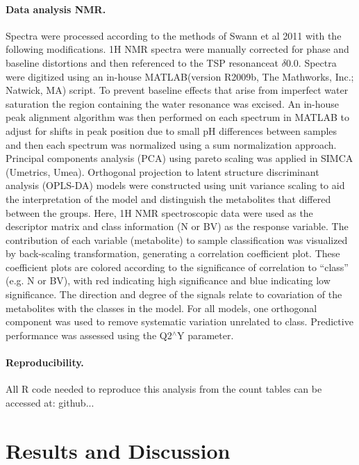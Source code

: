 \documentclass[10pt,letterpaper]{article}
\begin{document}
\paragraph{Data analysis NMR.}  Spectra were processed according to the methods of Swann et al 2011 \cite{Swann:2011} with the following modifications. 1H NMR spectra were manually corrected for phase and baseline distortions and then referenced to the TSP resonanceat $\delta$0.0. Spectra were digitized using an in-house MATLAB(version R2009b, The Mathworks, Inc.; Natwick, MA) script. To prevent baseline effects that arise from imperfect water saturation the region containing the water resonance was excised. An in-house peak alignment algorithm was then performed on each spectrum in MATLAB to adjust for shifts in peak position due to small pH differences between samples and then each spectrum was normalized using a sum normalization approach.  Principal components analysis (PCA) using pareto scaling was applied in SIMCA (Umetrics, Umea). Orthogonal projection to latent structure discriminant analysis (OPLS-DA) models were constructed using unit variance scaling to aid the interpretation of the model and distinguish the metabolites that differed between the groups. Here, 1H NMR spectroscopic data were used as the descriptor matrix and class information (N or BV) as the response variable. The contribution of each variable (metabolite) to sample classification was visualized by back-scaling transformation, generating a correlation coefficient plot. These coefficient plots are colored according to the significance of correlation to “class” (e.g. N or BV), with red indicating high significance and blue indicating low significance. The direction and degree of the signals relate to covariation of the metabolites with the classes in the model. For all models, one orthogonal component was used to remove systematic variation unrelated to class. Predictive performance was assessed using the Q2$^\wedge$Y parameter. 

\paragraph{Reproducibility.} All R code needed to reproduce this analysis from the count tables can be accessed at: github...


\section*{Results and Discussion}
\end{document}
